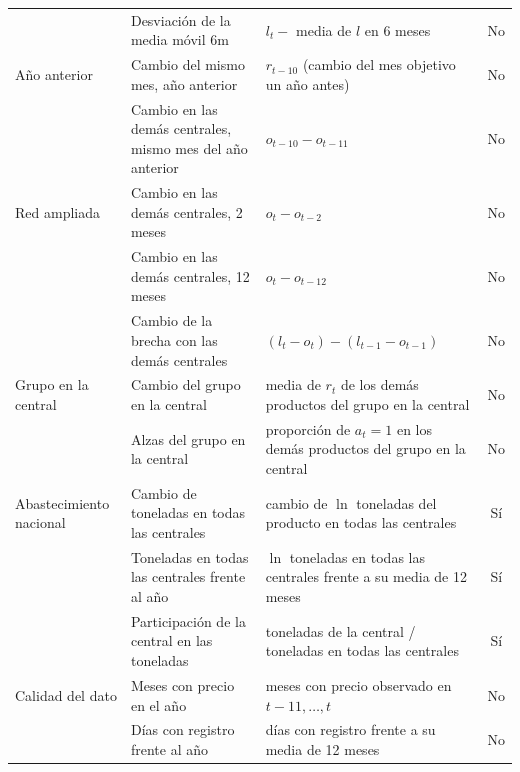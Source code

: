 \begin{longtable}{>{\raggedright\arraybackslash}p{2.3cm}>{\raggedright\arraybackslash}p{4.1cm}>{\raggedright\arraybackslash}p{6.2cm}c}
 & Desviación de la media móvil 6m & $l_t-$ media de $l$ en 6 meses & No \\
\addlinespace[2pt]
Año anterior & Cambio del mismo mes, año anterior & $r_{t-10}$ (cambio del mes objetivo un año antes) & No \\
 & Cambio en las demás centrales, mismo mes del año anterior & $o_{t-10}-o_{t-11}$ & No \\
\addlinespace[2pt]
Red ampliada & Cambio en las demás centrales, 2 meses & $o_t-o_{t-2}$ & No \\
 & Cambio en las demás centrales, 12 meses & $o_t-o_{t-12}$ & No \\
 & Cambio de la brecha con las demás centrales & $(l_t-o_t)-(l_{t-1}-o_{t-1})$ & No \\
\addlinespace[2pt]
Grupo en la central & Cambio del grupo en la central & media de $r_t$ de los demás productos del grupo en la central & No \\
 & Alzas del grupo en la central & proporción de $a_t=1$ en los demás productos del grupo en la central & No \\
\addlinespace[2pt]
Abastecimiento nacional & Cambio de toneladas en todas las centrales & cambio de $\ln$ toneladas del producto en todas las centrales & Sí \\
 & Toneladas en todas las centrales frente al año & $\ln$ toneladas en todas las centrales frente a su media de 12 meses & Sí \\
 & Participación de la central en las toneladas & toneladas de la central / toneladas en todas las centrales & Sí \\
\addlinespace[2pt]
Calidad del dato & Meses con precio en el año & meses con precio observado en $t-11,\dots,t$ & No \\
 & Días con registro frente al año & días con registro frente a su media de 12 meses & No \\
\end{longtable}
\normalsize
